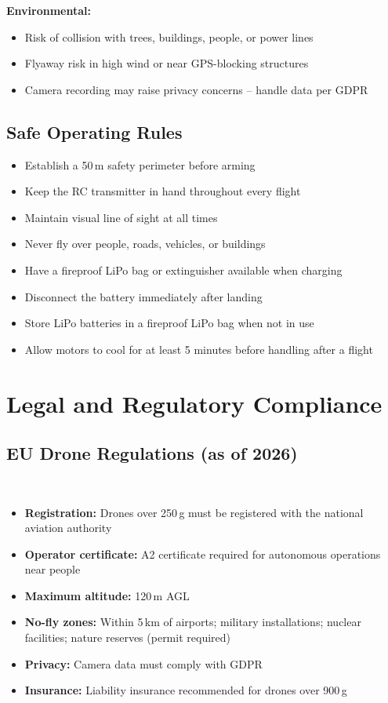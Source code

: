 \documentclass{article}
\begin{document}
\textbf{Environmental:}
\begin{itemize}
    \item Risk of collision with trees, buildings, people, or power lines
    \item Flyaway risk in high wind or near GPS-blocking structures
    \item Camera recording may raise privacy concerns -- handle data per GDPR
\end{itemize}

\subsection{Safe Operating Rules}

\begin{itemize}
    \item Establish a 50\,m safety perimeter before arming
    \item Keep the RC transmitter in hand throughout every flight
    \item Maintain visual line of sight at all times
    \item Never fly over people, roads, vehicles, or buildings
    \item Have a fireproof LiPo bag or extinguisher available when charging
    \item Disconnect the battery immediately after landing
    \item Store LiPo batteries in a fireproof LiPo bag when not in use
    \item Allow motors to cool for at least 5 minutes before handling after a flight
\end{itemize}

\section{Legal and Regulatory Compliance}

\subsection{EU Drone Regulations (as of 2026)}~\cite{eu_drone}

\begin{itemize}
    \item \textbf{Registration:} Drones over 250\,g must be registered with the national aviation authority
    \item \textbf{Operator certificate:} A2 certificate required for autonomous operations near people
    \item \textbf{Maximum altitude:} 120\,m AGL
    \item \textbf{No-fly zones:} Within 5\,km of airports; military installations; nuclear facilities; nature reserves (permit required)
    \item \textbf{Privacy:} Camera data must comply with GDPR
    \item \textbf{Insurance:} Liability insurance recommended for drones over 900\,g
\end{itemize}
\end{document}
